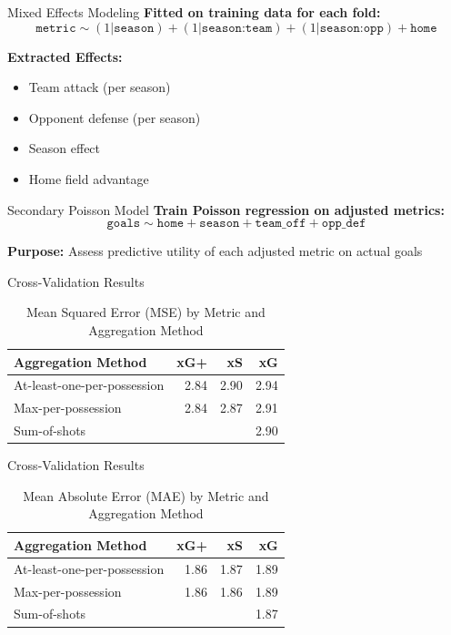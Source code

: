 \documentclass{beamer}
\begin{document}
\begin{frame}{Mixed Effects Modeling}
\textbf{Fitted on training data for each fold:}
$$\texttt{metric} \sim (1|\texttt{season}) + (1|\texttt{season:team}) + (1|\texttt{season:opp}) + \texttt{home}$$

\textbf{Extracted Effects:}
\begin{itemize}
\item Team attack (per season)
\item Opponent defense (per season)
\item Season effect
\item Home field advantage
\end{itemize}
\end{frame}

\begin{frame}{Secondary Poisson Model}
\textbf{Train Poisson regression on adjusted metrics:}
$$\texttt{goals} \sim \texttt{home} + \texttt{season} + \texttt{team\_off} + \texttt{opp\_def}$$

\textbf{Purpose:} Assess predictive utility of each adjusted metric on actual goals
\end{frame}

\begin{frame}{Cross-Validation Results}
\begin{table}[!h]
\centering
\caption{Mean Squared Error (MSE) by Metric and Aggregation Method}
\begin{tabular}[t]{lrrr}
\toprule
Aggregation Method & xG+ & xS & xG\\
\midrule
At-least-one-per-possession & 2.84 & 2.90 & 2.94\\
Max-per-possession & 2.84 & 2.87 & 2.91\\
Sum-of-shots &  &  & 2.90\\
\bottomrule
\end{tabular}
\end{table}
\end{frame}

\begin{frame}{Cross-Validation Results}
\begin{table}[!h]
\centering
\caption{Mean Absolute Error (MAE) by Metric and Aggregation Method}
\begin{tabular}[t]{lrrr}
\toprule
Aggregation Method & xG+ & xS & xG\\
\midrule
At-least-one-per-possession & 1.86 & 1.87 & 1.89\\
Max-per-possession & 1.86 & 1.86 & 1.89\\
Sum-of-shots &  &  & 1.87\\
\bottomrule
\end{tabular}
\end{table}
\end{frame}
\end{document}
